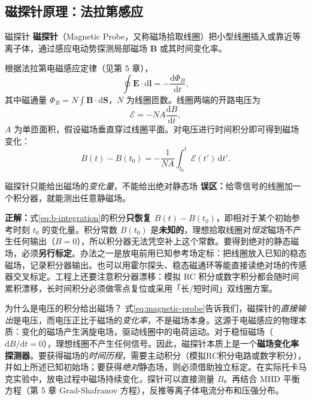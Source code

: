 \documentclass[12pt,a4paper,openany,oneside]{book}
\newcommand{\diff}{\mathrm{d}}
\newcommand{\vect}[1]{\bm{#1}}
\begin{document}
\subsection{磁探针原理：法拉第感应}

\begin{definition}{磁探针}{}{}
\textbf{磁探针}（Magnetic Probe，又称磁场拾取线圈）把小型线圈插入或靠近等离子体，通过感应电动势探测局部磁场 $\vect{B}$ 或其时间变化率。
\end{definition}

根据法拉第电磁感应定律（见第 5 章），
\begin{equation}
\oint \vect{E}\cdot\diff\vect{l} = -\frac{\diff\Phi_B}{\diff t},
\label{eq:faraday}
\end{equation}
其中磁通量 $\Phi_B = N \int \vect{B}\cdot\diff\vect{S}$，$N$ 为线圈匝数。线圈两端的开路电压为
\begin{equation}
\mathcal{E} = -N A \frac{\diff B}{\diff t},
\label{eq:magnetic-probe}
\end{equation}
$A$ 为单匝面积，假设磁场垂直穿过线圈平面。对电压进行时间积分即可得到磁场变化：
\begin{equation}
B(t) - B(t_0) = -\frac{1}{NA}\int_{t_0}^{t} \mathcal{E}(t')\,\diff t'.
\label{eq:b-integration}
\end{equation}

\begin{warning}{磁探针只能给出磁场的\emph{变化量}，不能给出绝对静态场}{}
\textbf{误区：}给零信号的线圈加一个积分器，就能测出任意静磁场。

\textbf{正解：}式\eqref{eq:b-integration}的积分\textbf{只恢复 $B(t)-B(t_0)$}，即相对于某个初始参考时刻 $t_0$ 的变化量。积分常数 $B(t_0)$ 是\textbf{未知的}，理想拾取线圈对\emph{恒定}磁场不产生任何输出（$\dot B = 0$），所以积分器无法凭空补上这个常数。要得到绝对的静态磁场，必须\textbf{另行标定}。办法之一是放电前用已知参考场定标：把线圈放入已知的稳态磁场，记录积分器输出。也可以用霍尔探头、稳态磁通环等能直接读绝对场的传感器交叉标定。工程上还要注意积分器漂移：模拟 RC 积分或数字积分都会随时间累积漂移，长时间积分必须做零点复位或采用「长/短时间」双线圈方案。
\end{warning}

\begin{insight}{为什么是电压的积分给出磁场？}{}
式\eqref{eq:magnetic-probe}告诉我们，磁探针的\emph{直接输出}是电压，而电压正比于磁场的\emph{变化率}，不是磁场本身。这源于电磁感应的物理本质：变化的磁场产生涡旋电场，驱动线圈中的电荷运动。对于稳恒磁场（$\diff B/\diff t = 0$），理想线圈不产生任何信号。因此，磁探针本质上是一个\textbf{磁场变化率探测器}。要获得磁场的\emph{时间历程}，需要主动积分（模拟RC积分电路或数字积分），并如上所述已知初始场；要获得\emph{绝对}静态场，则必须借助独立标定。在实际托卡马克实验中，放电过程中磁场持续变化，探针可以直接测量 $\dot{B}$。再结合 MHD 平衡方程（第 5 章 Grad-Shafranov 方程），反推等离子体电流分布和压强分布。
\end{insight}
\end{document}
